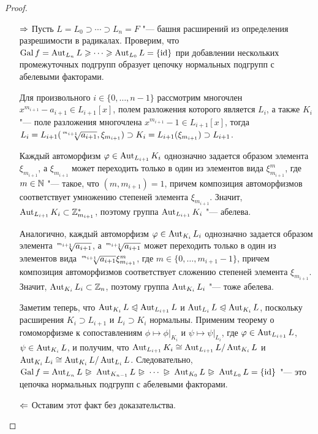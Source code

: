 \begin{proof}~
	\begin{itemize}
		\item[$\Rightarrow$] Пусть $L = L_0 \supset \dotsb \supset L_n = F$ "--- башня расширений из определения разрешимости в радикалах. Проверим, что $\operatorname{Gal}{f} = \operatorname{Aut}_{L_n}{L} \geqslant \dotsb \geqslant \operatorname{Aut}_{L_0}L = \{\operatorname{id}\}$ при добавлении нескольких промежуточных подгрупп образует цепочку нормальных подгрупп с абелевыми факторами.
		
		Для произвольного $i \in \{0, \dotsc, n - 1\}$ рассмотрим многочлен $x^{m_{i+1}} - a_{i+1} \in L_{i + 1}[x]$, полем разложения которого является $L_i$, а также $K_i$ "--- поле разложения многочлена $x^{m_{i+1}} - 1 \in L_{i + 1}[x]$, тогда $L_i = L_{i + 1}(\sqrt[\leftroot{2}\uproot{4}m_{i+1}]{a_{i+1}}, \xi_{m_{i+1}}) \supset K_i = L_{i + 1}(\xi_{m_{i+1}}) \supset L_{i + 1}$.
		
		Каждый автоморфизм $\varphi \in \operatorname{Aut}_{L_{i+1}}K_i$ однозначно задается образом элемента $\xi_{m_{i+1}}$, а $\xi_{m_{i+1}}$ может переходить только в один из элементов вида $\xi_{m_{i+1}}^m$, где $m \in \mathbb{N}$ "--- такое, что $(m, {m_{i+1}}) = 1$, причем композиция автоморфизмов соответствует умножению степеней элемента $\xi_{m_{i+1}}$. Значит, $\operatorname{Aut}_{L_{i+1}}K_i \subset \mathbb{Z}_{m_{i+1}}^*$, поэтому группа $\operatorname{Aut}_{L_{i+1}}K_i$ "--- абелева.
		
		Аналогично, каждый автоморфизм $\varphi \in \operatorname{Aut}_{K_i}L_i$ однозначно задается образом элемента $\sqrt[\leftroot{2}\uproot{4}m_{i+1}]{a_{i+1}}$, а $\sqrt[\leftroot{2}\uproot{4}m_{i+1}]{a_{i+1}}$ может переходить только в один из элементов вида $\sqrt[\leftroot{2}\uproot{4}m_{i+1}]{a_{i+1}}\xi_{m_{i+1}}^m$, где $m \in \{0, \dotsc, m_{i+1} - 1\}$, причем композиция автоморфизмов соответствует сложению степеней элемента $\xi_{m_{i+1}}$. Значит, $\operatorname{Aut}_{K_i}L_i \subset \mathbb{Z}_n$, поэтому группа $\operatorname{Aut}_{K_i}L_i$ "--- тоже абелева.
		
		Заметим теперь, что $\operatorname{Aut}_{K_i}L \trianglelefteqslant \operatorname{Aut}_{L_{i + 1}}L$ и $\operatorname{Aut}_{L_{i}}L \trianglelefteqslant \operatorname{Aut}_{K_i}L$, поскольку расширения $K_i \supset L_{i+1}$ и $L_i \supset K_i$ нормальны. Применим теорему о гомоморфизме к сопоставлениям $\phi \mapsto \phi|_{K_i}$ и $\psi \mapsto \psi|_{L_i}$, где $\varphi \in \operatorname{Aut}_{L_{i + 1}}L$, $\psi \in \operatorname{Aut}_{K_i}L$, и получим, что $\Aut_{L_{i+1}}K_i \hm\cong \Aut_{L_{i + 1}}L / \Aut_{K_i}L$ и $\operatorname{Aut}_{K_i}L_i \cong \operatorname{Aut}_{K_i}L / \operatorname{Aut}_{L_i}L$. Следовательно, $\Gal{f} = \Aut_{L_n}{L} \varnormal \Aut_{K_{n-1}}L \varnormal \dotsb \varnormal \Aut_{K_0}L \varnormal \Aut_{L_0}L = \{\id\}$ "--- это цепочка нормальных подгрупп с абелевыми факторами.
		
		\item[$\Leftarrow$] Оставим этот факт без доказательства.\qedhere
	\end{itemize}
\end{proof}

